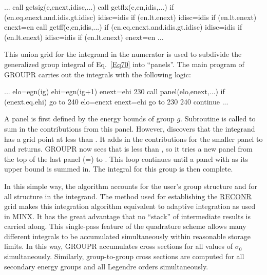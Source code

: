 \small
\begin{ccode}
     ...
      call getsig(e,enext,idisc,...)
      call getflx(e,en,idis,...)
      if (en.eq.enext.and.idis.gt.idisc) idisc=idis
      if (en.lt.enext) idisc=idis
      if (en.lt.enext) enext=en
      call getff(e,en,idis,...)
      if (en.eq.enext.and.idis.gt.idisc) idisc=idis
      if (en.lt.enext) idisc=idis
      if (en.lt.enext) enext=en
      ...
\end{ccode}
\normalsize

\noindent
This union grid for the integrand in the numerator is used to subdivide
the generalized group integral of Eq.~\ref{Eq70} into ``panels''.  The
main program of GROUPR carries out the integrals with the following logic:

\small
\begin{ccode}
      ...
      elo=egn(ig)
      ehi=egn(ig+1)
      enext=ehi
  230 call panel(elo,enext,...)
      if (enext.eq.ehi) go to 240
      elo=enext
      enext=ehi
      go to 230
  240 continue
      ...
\end{ccode}
\normalsize

\noindent
A panel is first defined by the energy bounds of group $g$.  Subroutine
 is called to sum in the contributions from this panel.
However,  discovers that the integrand has a grid point at
 less than .  It adds in the contributions for
the smaller panel  to  and returns.  GROUPR now
sees that  is less than , so it tries a new panel
from the top of the last panel (=) to .
This loop continues until a panel with  as its upper bound
is summed in.  The integral for this group is then complete.

In this simple way, the algorithm accounts for the user's group
structure and for all structure in the integrand.  The method used for
establishing the \hyperlink{sRECONRhy}{RECONR} grid
makes this integration algorithm
equivalent to adaptive integration as used in MINX\cite{MINX}.
It has the great advantage that no ``stack'' of intermediate results
is carried along.  This single-pass feature of the quadrature scheme
allows many different integrals to be accumulated simultaneously
within reasonable storage limits.  In this way, GROUPR accumulates
cross sections for all values of $\sigma_0$ simultaneously.  Similarly,
group-to-group cross sections are computed for all secondary energy
groups and all Legendre orders simultaneously.

